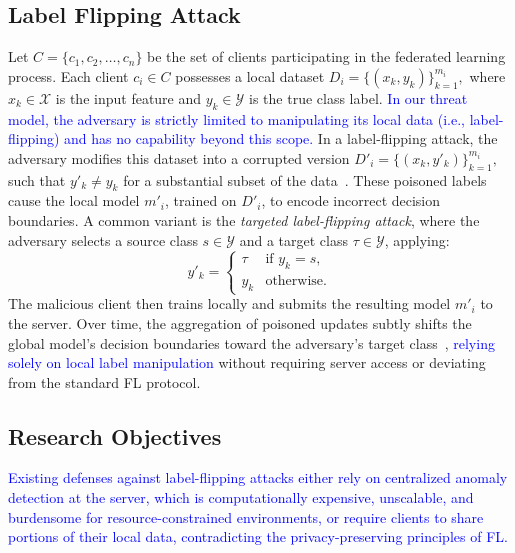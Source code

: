 \documentclass[conference]{IEEEtran}
\begin{document}
\subsection{Label Flipping Attack}
Let \(C = \{c_1, c_2, \ldots, c_n\}\) be the set of clients participating in the federated learning process. Each client \( c_i \in C \) possesses a local dataset \(D_i = \{(x_k, y_k)\}_{k=1}^{m_i},\) where \( x_k \in \mathcal{X} \) is the input feature and \( y_k \in \mathcal{Y} \) is the true class label. \textcolor{blue}{In our threat model, the adversary is strictly limited to manipulating its local data (i.e., label-flipping) and has no capability beyond this scope.} In a label-flipping attack, the adversary modifies this dataset into a corrupted version \(D'_i = \{(x_k, y'_k)\}_{k=1}^{m_i},\) such that \( y'_k \neq y_k \) for a substantial subset of the data~\cite{wang2020attack}. These poisoned labels cause the local model \( m'_i \), trained on \( D'_i \), to encode incorrect decision boundaries. A common variant is the \textit{targeted label-flipping attack}, where the adversary selects a source class \( s \in \mathcal{Y} \) and a target class \( \tau \in \mathcal{Y} \), applying:
\[
y'_k =
\begin{cases}
\tau & \text{if } y_k = s, \\
y_k & \text{otherwise.}
\end{cases}
\]
The malicious client then trains locally and submits the resulting model \( m'_i \) to the server. Over time, the aggregation of poisoned updates subtly shifts the global model's decision boundaries toward the adversary's target class~\cite{cao2020fltrust}, \textcolor{blue}{relying solely on local label manipulation} without requiring server access or deviating from the standard FL protocol.

\subsection{Research Objectives}
\textcolor{blue}{Existing defenses against label-flipping attacks either rely on centralized anomaly detection at the server, which is \textcolor{blue}{computationally expensive, unscalable, and burdensome for resource-constrained environments}, or require clients to share portions of their local data, \textcolor{blue}{contradicting the privacy-preserving principles of FL}.}
\end{document}
